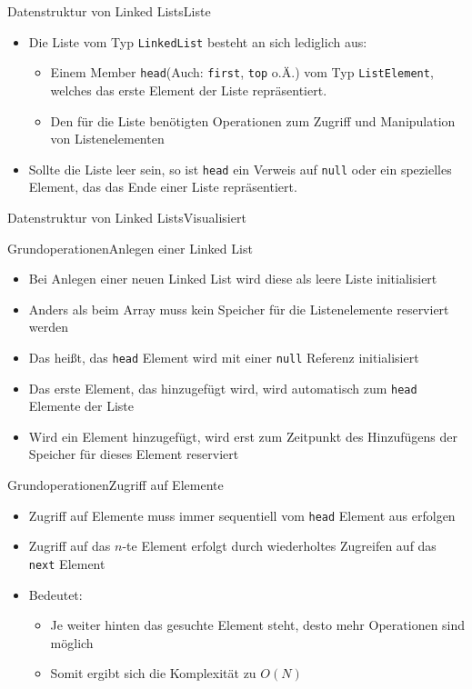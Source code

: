 \begin{frame}{Datenstruktur von Linked Lists}{Liste}
	\begin{itemize}
		\item Die Liste vom Typ \texttt{LinkedList} besteht an sich lediglich aus:
		\begin{itemize}
			\item Einem Member \texttt{head}(Auch: \texttt{first}, \texttt{top} o.Ä.) vom Typ \texttt{ListElement}, welches das erste Element der Liste repräsentiert.
			\item Den für die Liste benötigten Operationen zum Zugriff und Manipulation von Listenelementen
		\end{itemize}
		\item Sollte die Liste leer sein, so ist \texttt{head} ein Verweis auf \texttt{null} oder ein spezielles Element, das das Ende einer Liste repräsentiert.
	\end{itemize}
\end{frame}

\begin{frame}{Datenstruktur von Linked Lists}{Visualisiert}
\end{frame}

\begin{frame}{Grundoperationen}{Anlegen einer Linked List}
	\begin{itemize}
		\item Bei Anlegen einer neuen Linked List wird diese als leere Liste initialisiert
		\item Anders als beim Array muss kein Speicher für die Listenelemente reserviert werden
		\item Das heißt, das \texttt{head} Element wird mit einer \texttt{null} Referenz initialisiert
		\item Das erste Element, das hinzugefügt wird, wird automatisch zum \texttt{head} Elemente der Liste
		\item Wird ein Element hinzugefügt, wird erst zum Zeitpunkt des Hinzufügens der Speicher für dieses Element reserviert
	\end{itemize}
\end{frame}

\begin{frame}{Grundoperationen}{Zugriff auf Elemente}
	\begin{itemize}
		\item Zugriff auf Elemente muss immer sequentiell vom \texttt{head} Element aus erfolgen
		\item Zugriff auf das $n$-te Element erfolgt durch wiederholtes Zugreifen auf das \texttt{next} Element
		\item Bedeutet:
		\begin{itemize}
			\item Je weiter hinten das gesuchte Element steht, desto mehr Operationen sind möglich
			\item Somit ergibt sich die Komplexität zu $O(N)$
		\end{itemize}
	\end{itemize}
\end{frame}

